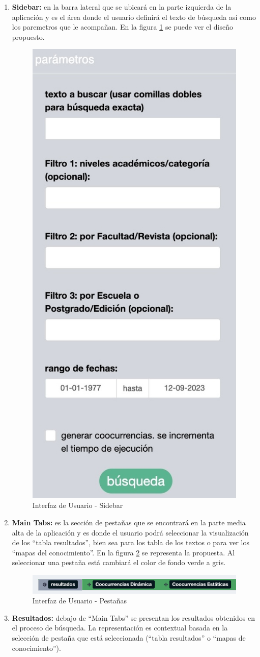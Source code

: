 \documentclass[
  12pt,
  openany]{book}
\begin{document}
\begin{enumerate}
\def\labelenumi{\arabic{enumi}.}
\item
  \textbf{Sidebar:} en la barra lateral que se ubicará en la parte izquierda de la aplicación y es el área donde el usuario definirá el texto de búsqueda así como los paremetros que le acompañan. En la figura \ref{fig:sidebar2} se puede ver el diseño propuesto.

  \begin{figure}

  {\centering \includegraphics[width=0.2\linewidth]{images/05-desarrollo/4_ciclo/UI/sidebar} 

  }

  \caption{Interfaz de Usuario - Sidebar}\label{fig:sidebar2}
  \end{figure}
\item
  \textbf{Main Tabs:} es la sección de pestañas que se encontrará en la parte media alta de la aplicación y es donde el usuario podrá seleccionar la visualización de los ``tabla resultados'', bien sea para los tabla de los textos o para ver los ``mapas del conocimiento''. En la figura \ref{fig:maintab} se representa la propuesta. Al seleccionar una pestaña está cambiará el color de fondo verde a gris.

  \begin{figure}

  {\centering \includegraphics[width=0.9\linewidth]{images/05-desarrollo/4_ciclo/UI/maintab} 

  }

  \caption{Interfaz de Usuario - Pestañas }\label{fig:maintab}
  \end{figure}
\item
  \textbf{Resultados:} debajo de ``Main Tabs'' se presentan los resultados obtenidos en el proceso de búsqueda. La representación es contextual basada en la selección de pestaña que está seleccionada (``tabla resultados'' o ``mapas de conocimiento'').


\end{enumerate}
\end{document}
